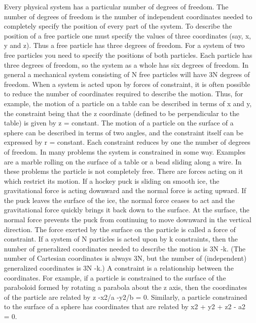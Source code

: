 Every physical system has a particular number of degrees of freedom. The
number of degrees of freedom is the number of independent coordinates needed
to completely specify the position of every part of the system. To describe the
position of a free particle one must specify the values of three coordinates (say,
x, y and z). Thus a free particle has three degrees of freedom. For a system
of two free particles you need to specify the positions of both particles. Each
particle has three degrees of freedom, so the system as a whole has six degrees
of freedom. In general a mechanical system consisting of N free particles will
have 3N degrees of freedom.
When a system is acted upon by forces of constraint, it is often possible to
reduce the number of coordinates required to describe the motion. Thus, for
example, the motion of a particle on a table can be described in terms of x and
y, the constraint being that the z coordinate (defined to be perpendicular to the
table) is given by z = constant. The motion of a particle on the surface of a
sphere can be described in terms of two angles, and the constraint itself can
be expressed by r = constant. Each constraint reduces by one the number of
degrees of freedom.
In many problems the system is constrained in some way. Examples are
a marble rolling on the surface of a table or a bead sliding along a wire. In
these problems the particle is not completely free. There are forces acting on
it which restrict its motion. If a hockey puck is sliding on smooth ice, the
gravitational force is acting downward and the normal force is acting upward.
If the puck leaves the surface of the ice, the normal force ceases to act and the
gravitational force quickly brings it back down to the surface. At the surface,
the normal force prevents the puck from continuing to move downward in the
vertical direction. The force exerted by the surface on the particle is called a
force of constraint.
If a system of N particles is acted upon by k constraints, then the number of
generalized coordinates needed to describe the motion is 3N -k. (The number of Cartesian coordinates is always 3N, but the number of (independent)
generalized coordinates is 3N -k.)
A constraint is a relationship between the coordinates. For example, if a
particle is constrained to the surface of the paraboloid formed by rotating
a parabola about the z axis, then the coordinates of the particle are related
by z -x2/a -y2/b = 0. Similarly, a particle constrained to the surface
of a sphere has coordinates that are related by x2 + y2 + z2 -
a2 = 0.


